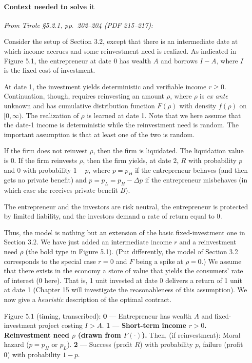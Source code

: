 \documentclass[11pt,a4paper]{article}
\begin{document}
\paragraph{Context needed to solve it}

\emph{From Tirole §5.2.1, pp.~202--204 (PDF 215--217):}

Consider the setup of Section 3.2, except that there is an intermediate date at which income accrues
and some reinvestment need is realized. As indicated in Figure 5.1, the entrepreneur at date 0 has
wealth \(A\) and borrows \(I - A\), where \(I\) is the fixed cost of investment.

At date 1, the investment yields deterministic and verifiable income \(r \geqslant 0\).
Continuation, though, requires reinvesting an amount \(\rho\), where \(\rho\) is \emph{ex ante}
unknown and has cumulative distribution function \(F(\rho)\) with density \(f(\rho)\) on
\([0, \infty)\). The realization of \(\rho\) is learned at date 1. Note that we here assume that the
date-1 income is deterministic while the reinvestment need is random. The important assumption is
that at least one of the two is random.

If the firm does not reinvest \(\rho\), then the firm is liquidated. The liquidation value is 0. If
the firm reinvests \(\rho\), then the firm yields, at date 2, \(R\) with probability \(p\) and 0
with probability \(1 - p\), where \(p = p_H\) if the entrepreneur behaves (and then gets no private
benefit) and \(p = p_L = p_H - \Delta p\) if the entrepreneur misbehaves (in which case she receives
private benefit \(B\)).

The entrepreneur and the investors are risk neutral, the entrepreneur is protected by limited
liability, and the investors demand a rate of return equal to 0.

Thus, the model is nothing but an extension of the basic fixed-investment one in Section 3.2. We
have just added an intermediate income \(r\) and a reinvestment need \(\rho\) (the bold type in
Figure 5.1). (Put differently, the model of Section 3.2 corresponds to the special case \(r = 0\)
and \(F\) being a spike at \(\rho = 0\).) We assume that there exists in the economy a store of
value that yields the consumers' rate of interest (0 here). That is, 1 unit invested at date 0
delivers a return of 1 unit at date 1 (Chapter 15 will investigate the reasonableness of this
assumption). We now give a \emph{heuristic} description of the optimal contract.

Figure 5.1 (timing, transcribed): \textbf{0} --- Entrepreneur has wealth \(A\) and fixed-investment
project costing \(I > A\). \textbf{1} --- \textbf{Short-term income \(r > 0\). Reinvestment need
\(\rho\) (drawn from \(F(\cdot)\)).} Then, (if reinvestment): Moral hazard (\(p = p_H\) or \(p_L\)).
\textbf{2} --- Success (profit \(R\)) with probability \(p\), failure (profit 0) with probability
\(1 - p\).
\end{document}
